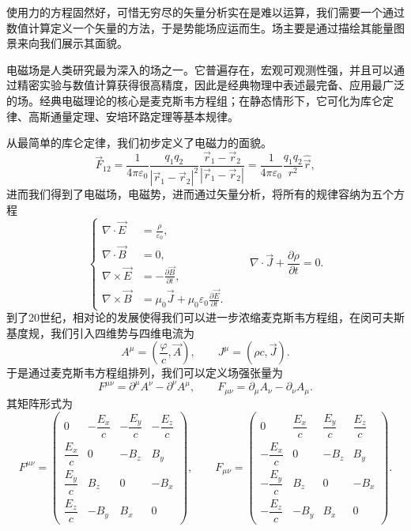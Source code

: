 \documentclass[UTF8]{ctexbook}
\begin{document}
使用力的方程固然好，可惜无穷尽的矢量分析实在是难以运算，我们需要一个通过数值计算定义一个矢量的方法，于是势能场应运而生。场主要是通过描绘其能量图景来向我们展示其面貌。

电磁场是人类研究最为深入的场之一。它普遍存在，宏观可观测性强，并且可以通过精密实验与数值计算获得很高精度，因此是经典物理中表述最完备、应用最广泛的场。经典电磁理论的核心是麦克斯韦方程组；在静态情形下，它可化为库仑定律、高斯通量定理、安培环路定理等基本规律。

从最简单的库仑定律，我们初步定义了电磁力的面貌。
\[
\vec{F}_{12}
= \frac{1}{4\pi\varepsilon_0}
\frac{q_1 q_2}{|\vec{r}_1-\vec{r}_2|^2}
\frac{\vec{r}_1-\vec{r}_2}{|\vec{r}_1-\vec{r}_2|}
= \frac{1}{4\pi\varepsilon_0}
\frac{q_1 q_2}{r^2}\hat{\vec{r}},
\]
进而我们得到了电磁场，电磁势，进而通过矢量分析，将所有的规律容纳为五个方程
\[
\left\{
\begin{aligned}
\nabla \cdot \vec{E} &= \frac{\rho}{\varepsilon_0}, \\
\nabla \cdot \vec{B} &= 0, \\
\nabla \times \vec{E} &= -\frac{\partial \vec{B}}{\partial t}, \\
\nabla \times \vec{B} &= \mu_0 \vec{J} + \mu_0 \varepsilon_0 \frac{\partial \vec{E}}{\partial t}.
\end{aligned}
\right.
\qquad
\nabla \cdot \vec{J} + \frac{\partial \rho}{\partial t} = 0.
\]
到了20世纪，相对论的发展使得我们可以进一步浓缩麦克斯韦方程组，在闵可夫斯基度规，我们引入四维势与四维电流为
\[
A^\mu=\left(\frac{\varphi}{c},\vec{A}\right),
\qquad
J^\mu=(\rho c,\vec{J}).
\]
于是通过麦克斯韦方程组排列，我们可以定义场强张量为
\[
F^{\mu\nu}=\partial^\mu A^\nu-\partial^\nu A^\mu,
\qquad
F_{\mu\nu}=\partial_\mu A_\nu-\partial_\nu A_\mu.
\]
其矩阵形式为
\[
F^{\mu\nu}=
\begin{pmatrix}
0 & -\dfrac{E_x}{c} & -\dfrac{E_y}{c} & -\dfrac{E_z}{c}\\[8pt]
\dfrac{E_x}{c} & 0 & -B_z & B_y\\[8pt]
\dfrac{E_y}{c} & B_z & 0 & -B_x\\[8pt]
\dfrac{E_z}{c} & -B_y & B_x & 0
\end{pmatrix},
\qquad
F_{\mu\nu}=
\begin{pmatrix}
0 & \dfrac{E_x}{c} & \dfrac{E_y}{c} & \dfrac{E_z}{c}\\[8pt]
-\dfrac{E_x}{c} & 0 & -B_z & B_y\\[8pt]
-\dfrac{E_y}{c} & B_z & 0 & -B_x\\[8pt]
-\dfrac{E_z}{c} & -B_y & B_x & 0
\end{pmatrix}.
\]
\end{document}
